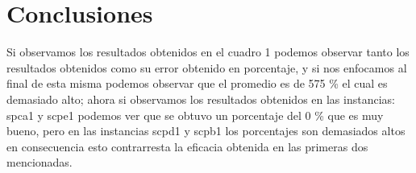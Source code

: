 \documentclass[12pt,a4paper]{article}
\begin{document}
\section{Conclusiones} 
Si observamos los resultados obtenidos en el cuadro 1 podemos observar tanto los resultados obtenidos como su error obtenido en porcentaje, y si nos enfocamos al final de esta misma podemos observar que el promedio es de 575 \% el cual es demasiado alto; ahora si observamos los resultados obtenidos en las instancias: spca1 y scpe1 podemos ver que se obtuvo un porcentaje del 0 \% que es muy bueno, pero en las instancias scpd1 y scpb1 los porcentajes son demasiados altos en consecuencia esto contrarresta la eficacia obtenida en las primeras dos mencionadas.

\newpage

\end{document}
